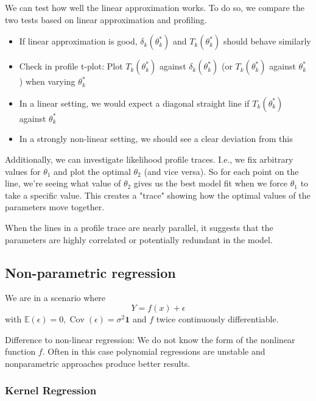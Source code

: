 \documentclass[11pt, %
	oneside, %
	english, %
	onehalfspacing, %
	]{article} %
\numberwithin{equation}{section}
\begin{document}
We can test how well the linear approximation works. To do so, we compare the two tests based on linear approximation and profiling.

\begin{itemize}
	\item If linear approximation is good, $\delta_k\left(\theta_k^*\right)$ and $T_k\left(\theta_k^*\right)$ should behave similarly
	\item Check in profile t-plot: Plot $T_k\left(\theta_k^*\right)$ against $\delta_k\left(\theta_k^*\right)$ (or $T_k\left(\theta_k^*\right)$ against  $\theta_k^*$ ) when varying $\theta_k^*$
	\item In a linear setting, we would expect a diagonal straight line if $T_k\left(\theta_k^*\right)$ against $\theta_k^*$
	\item In a strongly non-linear setting, we should see a clear deviation from this
\end{itemize}

Additionally, we can investigate likelihood profile traces. I.e., we fix arbitrary values for $\theta_1$ and plot the optimal $\theta_2$ (and vice versa). So for each point on the line, we're seeing what value of $\theta_2$ gives us the best model fit when we force $\theta_1$ to take a specific value. This creates a "trace" showing how the optimal values of the parameters move together.

When the lines in a profile trace are nearly parallel, it suggests that the parameters are highly correlated or potentially redundant in the model.




\subsection{Non-parametric regression}

We are in a scenario where
\begin{equation*}
    Y = f(x) + \epsilon
\end{equation*}
with $\mathbb{E}(\epsilon) = 0, \operatorname{Cov}(\epsilon) = \sigma^2 \mathbf{1}$ and $f$ twice continuously differentiable.

Difference to non-linear regression: We do not know the form of the nonlinear function $f$. Often in this case polynomial regressions are unstable and nonparametric approaches produce better results.

\subsubsection{Kernel Regression}
\end{document}
